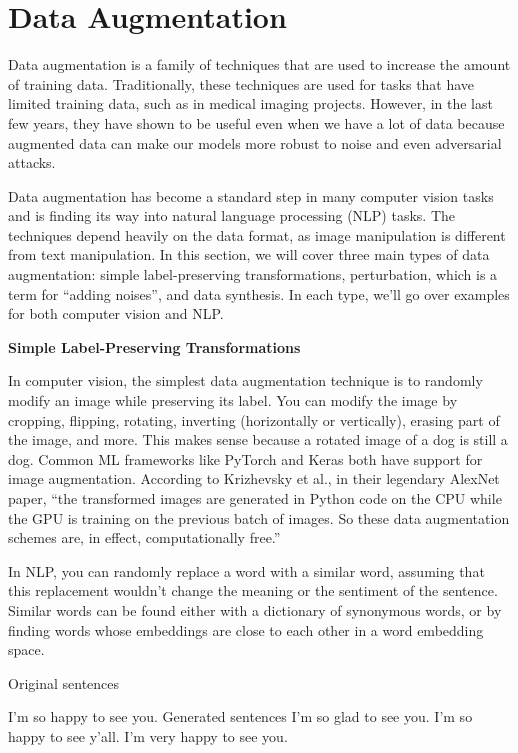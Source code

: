 \documentclass[openany]{book}
\begin{document}
\section{Data Augmentation}



Data augmentation is a family of techniques that are used to increase the amount of training data. Traditionally, these techniques are used for tasks that have limited training data, such as in medical imaging projects. However, in the last few years, they have shown to be useful even when we have a lot of data because augmented data can make our models more robust to noise and even adversarial attacks.

Data augmentation has become a standard step in many computer vision tasks and is finding its way into natural language processing (NLP) tasks. The techniques depend heavily on the data format, as image manipulation is different from text manipulation. In this section, we will cover three main types of data augmentation: simple label-preserving transformations, perturbation, which is a term for “adding noises”, and data synthesis. In each type, we’ll go over examples for both computer vision and NLP.

\textbf{Simple Label-Preserving Transformations}

In computer vision, the simplest data augmentation technique is to randomly modify an image while preserving its label. You can modify the image by cropping, flipping, rotating, inverting (horizontally or vertically), erasing part of the image, and more. This makes sense because a rotated image of a dog is still a dog. Common ML frameworks like PyTorch and Keras both have support for image augmentation. According to Krizhevsky et al., in their legendary AlexNet paper, “the transformed images are generated in Python code on the CPU while the GPU is training on the previous batch of images. So these data augmentation schemes are, in effect, computationally free.”

In NLP, you can randomly replace a word with a similar word, assuming that this replacement wouldn’t change the meaning or the sentiment of the sentence. Similar words can be found either with a dictionary of synonymous words, or by finding words whose embeddings are close to each other in a word embedding space.

Original sentences

I’m so happy to see you.
Generated sentences
I’m so glad to see you.
I’m so happy to see y’all.
I’m very happy to see you.
\end{document}
